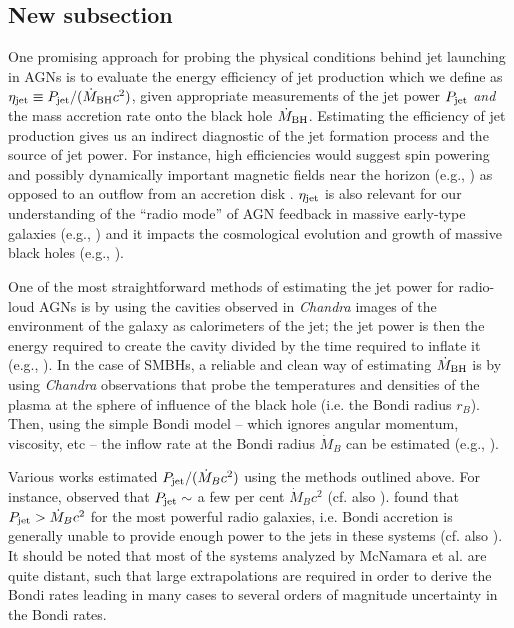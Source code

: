 \documentclass[useAMS,usenatbib]{mn2e}
\begin{document}
\subsection{New subsection}
One promising approach for probing the physical conditions behind jet launching in AGNs is to evaluate the energy efficiency of jet production which we define as $\eta_{\rm jet} \equiv P_{\rm jet}/(\dot{M}_{\rm BH} c^2)$, given appropriate measurements of the jet power $P_{\rm jet}$ \emph{and} the mass accretion rate onto the black hole $\dot{M}_{\rm BH}$. Estimating the efficiency of jet production gives us an indirect diagnostic of the jet formation process and the source of jet power. For instance, high efficiencies would suggest spin powering and possibly dynamically important magnetic fields near the horizon (e.g., \citealt{Sasha11,Zamaninasab14}) as opposed to an outflow from an accretion disk \citep{Blandford82,Ghosh97,Livio99}. $\eta_{\rm jet}$ is also relevant for our understanding of the ``radio mode'' of AGN feedback in massive early-type galaxies (e.g., \citealt{Allen06,McNamara07,Fabian12}) and it impacts the cosmological evolution and growth of massive black holes (e.g., \citealt{Fanidakis11,Volonteri12}).

One of the most straightforward methods of estimating the jet power for radio-loud AGNs is by using the cavities observed in \emph{Chandra} images of the environment of the galaxy as calorimeters of the jet; the jet power is then the energy required to create the cavity divided by the time required to inflate it (e.g., \citealt{Dunn04,Birzan04,Dunn05,Allen06,McNamara12}). In the case of SMBHs, a reliable and clean way of estimating $\dot{M}_{\rm BH}$ is by using \emph{Chandra} observations that probe the temperatures and densities of the plasma at the sphere of influence of the black hole (i.e. the Bondi radius $r_B$). Then, using the simple Bondi model \citep{Bondi52} -- which ignores angular momentum, viscosity, etc -- the inflow rate at the Bondi radius $\dot{M}_B$ can be estimated (e.g., \citealt{Di-Matteo03}). 

Various works estimated $P_{\rm jet}/(\dot{M}_B c^2)$ using the methods outlined above. For instance, \cite{Allen06} observed that $P_{\rm jet} \sim$ a few per cent $\dot{M}_B c^2$ (cf. also \citealt{Merloni07,Balmaverde08,Vattakunnel10,Russell13}). \cite{McNamara11} found that $P_{\rm jet} > \dot{M}_B c^2$ for the most powerful radio galaxies, i.e. Bondi accretion is generally unable to provide enough power to the jets in these systems (cf. also \citealt{Rafferty06}). It should be noted that most of the systems analyzed by McNamara et al. are quite distant, such that large extrapolations are required in order to derive the Bondi rates leading in many cases to several orders of magnitude uncertainty in the Bondi rates.
\end{document}
